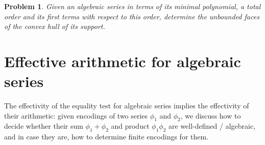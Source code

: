 \documentclass[a4paper,draft]{amsart}
\newtheorem{Problem}{Problem}
\theoremstyle{definition}
\newtheorem{Example}{Example}
\begin{document}
\begin{Problem}\label{prob:faces}
Given an algebraic series in terms of its minimal polynomial, a total order and its first terms with respect to this order, determine the unbounded faces of the convex hull of its support.
\end{Problem}



\section{Effective arithmetic for algebraic series}

The effectivity of the equality test for algebraic series implies the effectivity of their arithmetic: given encodings of two series $\phi_1$ and $\phi_2$, we discuss how to decide whether their sum $\phi_1+\phi_2$ and product $\phi_1\phi_2$ are well-defined / algebraic, and in case they are, how to determine finite encodings for them.\\
\end{document}

